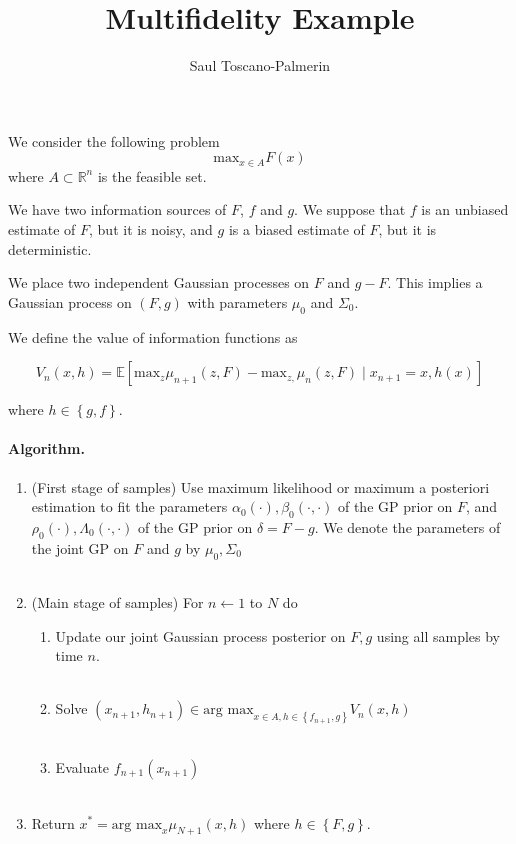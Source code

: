\documentclass[12pt,english]{article}
\author{Saul Toscano-Palmerin}
\date{}
\begin{document}
\title{Multifidelity Example}

\maketitle
We consider the following problem
\[
\mbox{max}_{x\in A}F\left(x\right)
\]
where $A\subset\mathbb{R}^{n}$ is the feasible set.

We have two information sources of $F$, $f$ and $g$. We suppose that $f$
is an unbiased estimate of $F$, but it is noisy, and $g$ is a biased
estimate of $F$, but it is deterministic.

We place two independent Gaussian processes on $F$ and $g-F$. This implies a Gaussian process
on $(F,g)$ with parameters $\mu_{0}$ and $\Sigma_{0}$.

We define the value of information functions as

\[
V_{n}\left(x,h\right)=\mathbb{E}\left[\mbox{max}_{z}\mu_{n+1}\left(z,F\right)-\mbox{max}_{z,}\mu_{n}\left(z,F\right)\mid x_{n+1}=x,h\left(x\right)\right]
\]

where $h\in\left\{ g,f\right\} $.


\paragraph{Algorithm.}

\begin{enumerate}
\item (First stage of samples) Use maximum likelihood or maximum a posteriori estimation to fit the
parameters $\alpha_{0}\left(\cdot\right),\beta_{0}\left(\cdot,\cdot\right)$
of the GP prior on $F$, and $\rho_{0}\left(\cdot\right),\Lambda_{0}\left(\cdot,\cdot\right)$
of the GP prior on $\delta=F-g$. We denote the parameters of the joint GP on $F$ and $g$ by
$\mu_{0},\Sigma_{0}$\\
 \textrm{}\\
\item (Main stage of samples) For $n\leftarrow1$ to $N$ do
\begin{enumerate}
    \item Update our joint Gaussian process posterior on $F,g$ using all samples by time $n$.\\
    \textrm{}\\
\item Solve $\left(x_{n+1},h_{n+1}\right)\in\mbox{arg max}_{x\in A,h\in\left\{ f_{n+1},g\right\} }V_{n}\left(x,h\right)$\\
\textrm{}\\
\item Evaluate $f_{n+1}\left(x_{n+1}\right)$\\
\textrm{}\\
\end{enumerate}
\item Return $x^{*}=\mbox{arg max}_{x}\mu_{N+1}\left(x,h\right)$ where $h\in\left\{ F,g\right\}$.
\end{enumerate}
\end{document}
